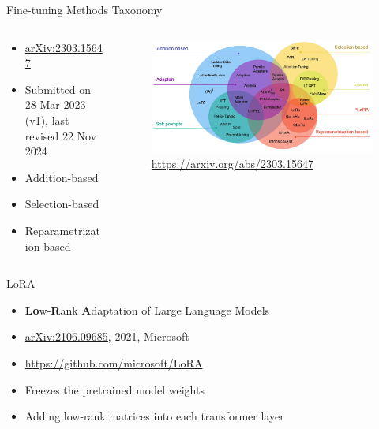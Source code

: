 \documentclass[aspectratio=169]{beamer}
\begin{document}


\begin{frame}{Fine-tuning Methods Taxonomy}

  \begin{columns}
    \begin{column}{0.5\textwidth}
      \begin{itemize}
        \setlength\itemsep{1em}
        \item \href{https://arxiv.org/abs/2303.15647}{arXiv:2303.15647}
        \item Submitted on 28 Mar 2023 (v1), last revised 22 Nov 2024
        \item Addition-based
        \item Selection-based
        \item Reparametrization-based
      \end{itemize}
    \end{column}
    \begin{column}{0.5\textwidth}
      \begin{figure}
        \includegraphics[width = \textwidth]{images/fine-tuning-methods-taxonomy.png}
        \caption{\footnotesize \url{https://arxiv.org/abs/2303.15647}}
      \end{figure}
    \end{column}
  \end{columns}

  
\end{frame}


\begin{frame}{LoRA}

  \begin{itemize}
    \setlength\itemsep{1em}
    \item \textbf{Lo}w-\textbf{R}ank \textbf{A}daptation of Large Language Models
    \item \href{https://arxiv.org/abs/2106.09685}{arXiv:2106.09685}, 2021, Microsoft
    \item \url{https://github.com/microsoft/LoRA}
    \item Freezes the pretrained model weights
    \item Adding low-rank matrices into each transformer layer
  \end{itemize}

\end{frame}
\end{document}
